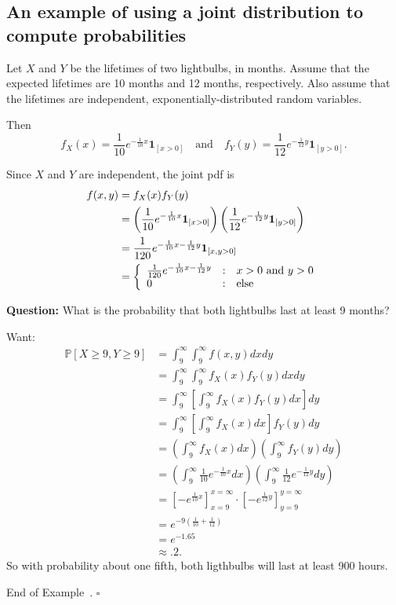\documentclass[10pt]{article}
\theoremstyle{definition}
\newtheorem{example}[theorem]{Example}
\renewenvironment{example}
{\begin{oldexample}}
  {\par\smallskip\hfill   End of Example~\theexample. $\square$    \par\end{oldexample}}
\newcommand{\1}[1]{\textbf{1}_{\left[#1\right]}} %
\def\P{\mathbb{P}} %
\begin{document}
\subsection{An example of using a joint distribution to compute probabilities}
\begin{example}
  Let $X$ and $Y$ be the lifetimes of two lightbulbs, in months. Assume that
  the expected lifetimes are 10 months and 12 months, respectively. Also
  assume that the lifetimes are independent, exponentially-distributed random variables.

  Then
  \begin{equation*}
    f_{X}(x) = \frac{1}{10} e^{-\frac{1}{10} x}\mathbf{1}_{[x>0]} \quad \text{and} \quad f_{Y}(y) = \frac{1}{12} e^{-\frac{1}{12} y}\mathbf{1}_{[y>0]}.
  \end{equation*}
  
  Since $X$ and $Y$ are independent, the joint pdf is
  \begin{align*}
    f(x,y) 
    &= f_{X}(x)f_{Y}(y)\\
    &= \left( \frac{1}{10} e^{-\frac{1}{10} x}\mathbf{1}_{[x>0]} \right) \left( \frac{1}{12} e^{-\frac{1}{12} y}\mathbf{1}_{[y>0]} \right)\\ 
    &= \frac{1}{120} e^{-\frac{1}{10} x-\frac{1}{12} y }\mathbf{1}_{[x,y>0]}\\
    &= \left\{ \begin{array}{l@{\quad:\quad}l} \frac{1}{120} e^{-\frac{1}{10}
          x-\frac{1}{12} y } & x>0 \text{ and }y>0\\ 0& \text{else}
      \end{array}\right.
  \end{align*}


  \textbf{Question:} What is the probability that both lightbulbs last at
  least 9 months?

  Want:
  \begin{align*}
    \P\left[X \geq 9, Y \geq 9\right]
    &= \int_{9}^{\infty} \int_{9}^{\infty} f(x,y)dxdy\\
    &= \int_{9}^{\infty} \int_{9}^{\infty} f_{X}(x) f_{Y}(y) dxdy\\
    &= \int_{9}^{\infty} \left[ \int_{9}^{\infty} f_{X}(x) f_{Y}(y) dx \right] dy\\
    &= \int_{9}^{\infty} \left[ \int_{9}^{\infty} f_{X}(x)  dx \right] f_{Y}(y)dy\\
    &= \left( \int_{9}^{\infty} f_{X}(x)dx \right)  \left( \int_{9}^{\infty} f_{Y}(y) dy \right) \\
    &= \left( \int_{9}^{\infty} \frac{1}{10}e^{-\frac{1}{10}x}dx \right)  \left( \int_{9}^{\infty} \frac{1}{12}e^{-\frac{1}{12}y}dy \right) \\
    &= \left[ -e^{\frac{1}{10}x} \right]^{x=\infty}_{x=9} \cdot \left[ -e^{\frac{1}{12}y} \right]^{y=\infty}_{y=9}\\  
    &=e^{-9 \left( \frac{1}{10}+\frac{1}{12} \right) }\\
    &=e^{-1.65}\\
    &\approx .2.
  \end{align*}
  So with probability about one fifth, both ligthbulbs will last at least 900 hours.


\end{example}
\end{document}
